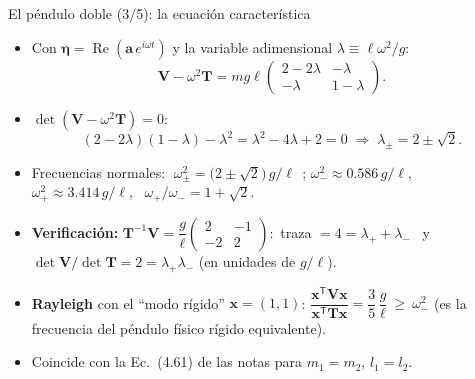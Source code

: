 \documentclass[spanish]{beamer}
\newcommand{\Tm}{\mathbf{T}}              %
\newcommand{\Vm}{\mathbf{V}}              %
\newcommand{\bfeta}{\boldsymbol{\eta}}    %
\newcommand{\ba}{\boldsymbol{a}}          %
\begin{document}
\begin{frame}{El péndulo doble (3/5): la ecuación característica}
\small
\begin{itemize}
\item<1-> Con $\bfeta=\operatorname{Re}(\ba\,e^{i\omega t})$ y la variable adimensional $\lambda\equiv\ell\omega^2/g$:
\[
\Vm-\omega^2\Tm=mg\ell\begin{pmatrix}2-2\lambda&-\lambda\\-\lambda&1-\lambda\end{pmatrix}.
\]
\item<2-> $\det(\Vm-\omega^2\Tm)=0$:
\[
(2-2\lambda)(1-\lambda)-\lambda^2=\lambda^2-4\lambda+2=0
\;\Rightarrow\;
\lambda_\pm=2\pm\sqrt2 .
\]
\item<3-> Frecuencias normales:\quad
$\boxed{\;\omega_\pm^2=\big(2\pm\sqrt2\big)\,g/\ell\;}$\,; \quad
$\omega_-^2\approx0.586\,g/\ell$, \ $\omega_+^2\approx3.414\,g/\ell$, \ $\omega_+/\omega_-=1+\sqrt2$.
\item<4-> \textbf{Verificación:} $\Tm^{-1}\Vm=\dfrac{g}{\ell}\begin{pmatrix}2&-1\\-2&2\end{pmatrix}$:\ traza $=4=\lambda_++\lambda_-$ \ y \ $\det\Vm/\det\Tm=2=\lambda_+\lambda_-$ (en unidades de $g/\ell$).
\item<5-> \textbf{Rayleigh} con el ``modo rígido'' $\boldsymbol x=(1,1)$: $\dfrac{\boldsymbol x^{\mathsf T}\Vm\boldsymbol x}{\boldsymbol x^{\mathsf T}\Tm\boldsymbol x}=\dfrac35\,\dfrac{g}{\ell}\ \ge\ \omega_-^2$ (es la frecuencia del péndulo físico rígido equivalente).
\item<6-> Coincide con la Ec.~(4.61) de las notas para $m_1=m_2$, $l_1=l_2$.
\end{itemize}
\end{frame}
\end{document}
